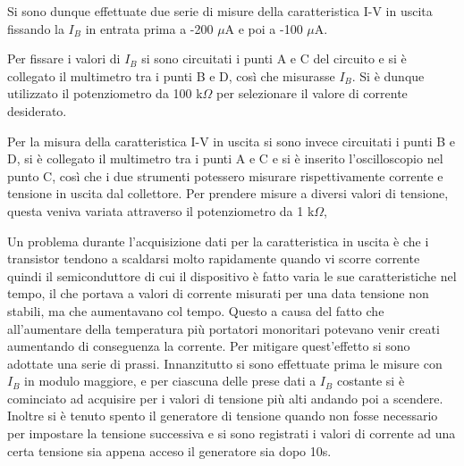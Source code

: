 \documentclass[a4paper,11pt]{article}
\begin{document}
Si sono dunque effettuate due serie di misure della caratteristica I-V in uscita fissando la $I_B$ in entrata prima a -200 $\mu$A e poi a -100 $\mu$A. 

Per fissare i valori di $I_B$ si sono circuitati i punti A e C del circuito e si è collegato il multimetro tra i punti B e D, così che misurasse $I_B$. Si è dunque utilizzato il potenziometro da 100 k$\Omega$ per selezionare il valore di corrente desiderato.

Per la misura della caratteristica I-V in uscita si sono invece circuitati i punti B e D, si è collegato il multimetro tra i punti A e C e si è inserito l'oscilloscopio nel punto C, così che i due strumenti potessero misurare rispettivamente corrente e tensione in uscita dal collettore. Per prendere misure a diversi valori di tensione, questa veniva variata attraverso il potenziometro da 1 k$\Omega$,

Un problema durante l'acquisizione dati per la caratteristica in uscita è che i transistor tendono a scaldarsi molto rapidamente quando vi scorre corrente quindi il semiconduttore di cui il dispositivo è fatto varia le sue caratteristiche nel tempo, il che portava a valori di corrente misurati per una data tensione non stabili, ma che aumentavano col tempo. Questo a causa del fatto che all'aumentare della temperatura più portatori monoritari potevano venir creati aumentando di conseguenza la corrente. Per mitigare quest'effetto si sono adottate una serie di prassi. Innanzitutto si sono effettuate prima le misure con $I_B$ in modulo maggiore, e per ciascuna delle prese dati a $I_B$ costante si è cominciato ad acquisire per i valori di tensione più alti andando poi a scendere. Inoltre si è tenuto spento il generatore di tensione quando non fosse necessario per impostare la tensione successiva e si sono registrati i valori di corrente ad una certa tensione sia appena acceso il generatore sia dopo 10s.
\end{document}
